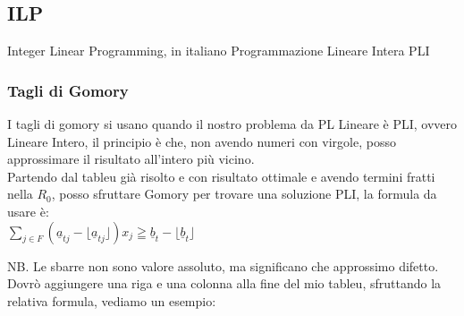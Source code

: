 \documentclass{article}
\begin{document}
\begin{center}
\end{center}
\subsection{ILP}
Integer Linear Programming, in italiano Programmazione Lineare Intera PLI
\subsubsection{Tagli di Gomory}
I tagli di gomory si usano quando il nostro problema da PL Lineare è PLI, ovvero Lineare Intero, il principio è che, non avendo numeri con virgole, posso approssimare il risultato all'intero più vicino.\\

Partendo dal tableu già risolto e con risultato ottimale e avendo termini fratti nella $R_0$, posso sfruttare Gomory per trovare una soluzione PLI, la formula da usare è:\\
$\displaystyle \sum_{j \in F} ( \underline{a}_{tj} - \lfloor \underline{a}_{tj} \rfloor )x_j \geqq \underline{b}_t -  \lfloor \underline{b}_t \rfloor$

NB. Le sbarre non sono valore assoluto, ma significano che approssimo difetto.\\
Dovrò aggiungere una riga e una colonna alla fine del mio tableu, sfruttando la relativa formula, vediamo un esempio:\\

\begin{center}
\end{center}
\end{document}
